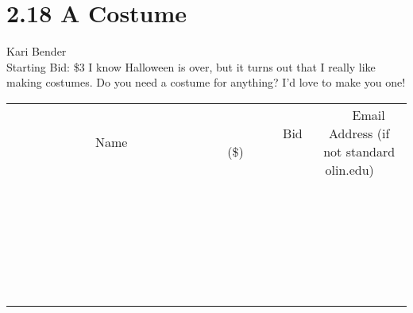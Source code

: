 \documentclass[11pt]{article}
\begin{document}
\section*{2.18 A Costume}
Kari Bender
\\
Starting Bid: \$3
\newline
I know Halloween is over, but it turns out that I really like making costumes. Do you need a costume for anything? I'd love to make you one!
\\[6ex]
\begin{tabular}{c c c}
~~~~~~~~~~~~~Name~~~~~~~~~~~~~ & ~~~~~~~~~Bid (\$)~~~~~~~~~  & ~~~Email Address (if not standard olin.edu)~~~\\
 & & \\
\hline
 & & \\
\hline
 & & \\
\hline
 & & \\
\hline
 & & \\
\hline
 & & \\
\hline
 & & \\
\hline
 & & \\
\hline
 & & \\
\hline
 & & \\
\hline
 & & \\
\hline
 & & \\
\hline
 & & \\
\hline
 & & \\
\hline
 & & \\
\hline
 & & \\
\hline
 & & \\
\hline
 & & \\
\hline
 & & \\
\hline
 & & \\
\hline
 & & \\
\hline
 & & \\
\hline
 & & \\
\hline
 & & \\
\hline
 & & \\
\hline
 & & \\
\hline
\end{tabular}
\newpage
\end{document}
